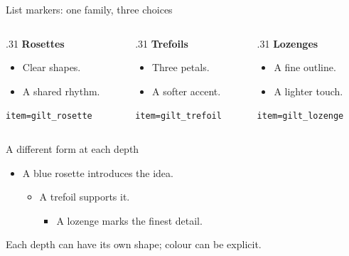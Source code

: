 \documentclass[aspectratio=169]{beamer}
\begin{document}
\begin{frame}{List markers: one family, three choices}
  \begin{columns}[T,onlytextwidth]
    \begin{column}{.31\textwidth}
      \textbf{Rosettes}\par\smallskip
      \begin{itemize}\item Clear shapes.\item A shared rhythm.\end{itemize}
      {\scriptsize\texttt{item=gilt\_rosette}}
    \end{column}
    \begin{column}{.31\textwidth}
      \textbf{Trefoils}\par\smallskip
      \begin{itemize}\item Three petals.\item A softer accent.\end{itemize}
      {\scriptsize\texttt{item=gilt\_trefoil}}
    \end{column}
    \begin{column}{.31\textwidth}
      \textbf{Lozenges}\par\smallskip
      \begin{itemize}\item A fine outline.\item A lighter touch.\end{itemize}
      {\scriptsize\texttt{item=gilt\_lozenge}}
    \end{column}
  \end{columns}
\end{frame}
\begin{frame}{A different form at each depth}
  \begin{itemize}
    \item A blue rosette introduces the idea.
      \begin{itemize}\item A trefoil supports it.
        \begin{itemize}\item A lozenge marks the finest detail.\end{itemize}
      \end{itemize}
  \end{itemize}
  \medskip
  {\small Each depth can have its own shape; colour can be explicit.}
\end{frame}
\end{document}
